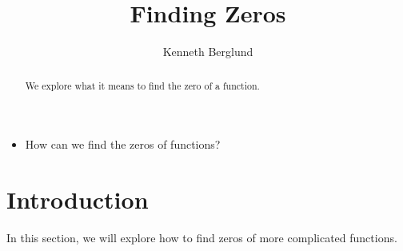 \documentclass[nooutcomes]{ximera}
\author{Kenneth Berglund}
\title{Finding Zeros}
\begin{document}
\begin{abstract}
 We explore what it means to find the zero of a function.
\end{abstract}
\maketitle



\begin{motivatingQuestions}\begin{itemize}
\item How can we find the zeros of functions?
\end{itemize}\end{motivatingQuestions}



\section{Introduction}
In this section, we will explore how to find zeros of more complicated functions.  
\end{document}
